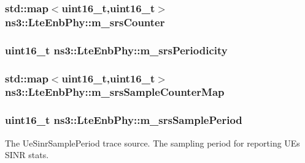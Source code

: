 \subsubsection[{\texorpdfstring{m\+\_\+srs\+Counter}{m_srsCounter}}]{\setlength{\rightskip}{0pt plus 5cm}std\+::map$<$uint16\+\_\+t,uint16\+\_\+t$>$ ns3\+::\+Lte\+Enb\+Phy\+::m\+\_\+srs\+Counter\hspace{0.3cm}{\ttfamily [private]}}\hypertarget{classns3_1_1LteEnbPhy_af30597488cea3c071d5de05fb357bc98}{}\label{classns3_1_1LteEnbPhy_af30597488cea3c071d5de05fb357bc98}
\subsubsection[{\texorpdfstring{m\+\_\+srs\+Periodicity}{m_srsPeriodicity}}]{\setlength{\rightskip}{0pt plus 5cm}uint16\+\_\+t ns3\+::\+Lte\+Enb\+Phy\+::m\+\_\+srs\+Periodicity\hspace{0.3cm}{\ttfamily [private]}}\hypertarget{classns3_1_1LteEnbPhy_a00aa262d5518685d154da3631cc03670}{}\label{classns3_1_1LteEnbPhy_a00aa262d5518685d154da3631cc03670}
\subsubsection[{\texorpdfstring{m\+\_\+srs\+Sample\+Counter\+Map}{m_srsSampleCounterMap}}]{\setlength{\rightskip}{0pt plus 5cm}std\+::map$<$uint16\+\_\+t,uint16\+\_\+t$>$ ns3\+::\+Lte\+Enb\+Phy\+::m\+\_\+srs\+Sample\+Counter\+Map\hspace{0.3cm}{\ttfamily [private]}}\hypertarget{classns3_1_1LteEnbPhy_aaafd624cc9ea841044feddc32c0e3ab5}{}\label{classns3_1_1LteEnbPhy_aaafd624cc9ea841044feddc32c0e3ab5}
\subsubsection[{\texorpdfstring{m\+\_\+srs\+Sample\+Period}{m_srsSamplePeriod}}]{\setlength{\rightskip}{0pt plus 5cm}uint16\+\_\+t ns3\+::\+Lte\+Enb\+Phy\+::m\+\_\+srs\+Sample\+Period\hspace{0.3cm}{\ttfamily [private]}}\hypertarget{classns3_1_1LteEnbPhy_a16c1df8f3a289036ffc98042e9b47094}{}\label{classns3_1_1LteEnbPhy_a16c1df8f3a289036ffc98042e9b47094}
The {\ttfamily Ue\+Sinr\+Sample\+Period} trace source. The sampling period for reporting U\+Es\textquotesingle{} S\+I\+NR stats. 
